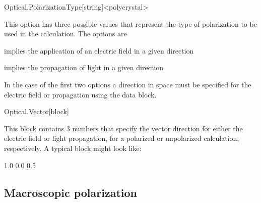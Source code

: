 \begin{fdfentry}{Optical.PolarizationType}[string]<polycrystal>

  This option has three possible values that represent the type of
  polarization to be used in the calculation. The options are
  \begin{fdfoptions}
    \option[polarized]%
    implies the application of an electric field in a given direction

    \option[unpolarized]%
    implies the propagation of light in a given direction

    \option[polycrystal]%
    In the case of the first two options a direction in space must be
    specified for the electric field or propagation using the
     data block.

  \end{fdfoptions}
  
\end{fdfentry}

\begin{fdfentry}{Optical.Vector}[block]
  
  This block contains 3 numbers that specify the vector direction for
  either the electric field or light propagation, for a polarized or
  unpolarized calculation, respectively. A typical block might look
  like:
  \begin{fdfexample}
        1.0 0.0 0.5
  \end{fdfexample}

\end{fdfentry}




\subsection{Macroscopic polarization}


